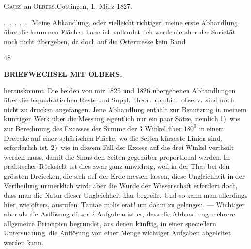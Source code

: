 \begin{center}
\textsc{Gauss} an \textsc{Olbers}.\quad Göttingen, 1.~März 1827.
\end{center}

\par\noindent\hspace*{\parindent}\mbox{.\ .\ .\ .\ .\ .}\quad Meine Abhandlung, oder vielleicht richtiger, meine erste Abhandlung über die krummen Flächen habe ich vollendet; ich werde sie aber der Societät noch nicht übergeben, da doch auf die Ostermesse kein Band
\par\smallskip\noindent{}\hfill{\footnotesize48}\hspace*{0.14\linewidth}\par
\clearpage
\noindent{}\hfill{\small\textbf{BRIEFWECHSEL MIT OLBERS.}}\hfill\null\par\medskip
\noindent herauskommt.
Die beiden von mir 1825 und 1826 übergebenen Abhandlungen über die biquadratischen Reste und Suppl.\ theor.\ combin.\ observ.\ sind noch nicht zu drucken angefangen.
Jene Abhandlung enthält zur  Benutzung in meinem künftigen Werk über die Messung eigentlich nur ein paar Sätze, nemlich 1)~was zur Berechnung des Excesses der Summe der 3 Winkel über \(180^{0}\) in einem Dreiecke auf einer  sphärischen Fläche, wo die Seiten kürzeste Linien sind, erforderlich ist, 2)~wie in diesem Fall der Excess auf die drei Winkel  vertheilt werden muss, damit die Sinus den Seiten gegenüber proportional werden.
In praktischer Rücksicht ist dies zwar ganz unwichtig, weil in der That bei den grössten Dreiecken, die sich auf der Erde messen lassen, diese Ungleichheit in der Vertheilung unmerklich wird; aber die Würde der Wissenschaft erfordert doch, dass man die Natur dieser Ungleichheit klar begreife.
Und so kann man allerdings hier, wie öfters, ausrufen: Tantae molis erat! um dahin zu gelangen. ---
Wichtiger aber als die Auflösung dieser 2 Aufgaben ist es, dass die Abhandlung mehrere allgemeine Principien begründet, aus denen künftig, in einer speciellern Untersuchung, die Auflösung von einer Menge wichtiger Aufgaben abgeleitet werden kann.

